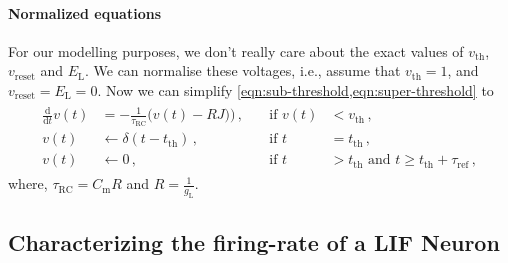 \documentclass[10pt,letterpaper,oneside]{article}
\begin{document}

\paragraph{Normalized equations}
For our modelling purposes, we don't really care about the exact values of $v_\mathrm{th}$, $v_\mathrm{reset}$ and $E_\mathrm{L}$. We can normalise these voltages, i.e., assume that $v_\mathrm{th} = 1$, and $v_\mathrm{reset} = E_\mathrm{L} = 0$. Now we can simplify \cref{eqn:sub-threshold,eqn:super-threshold} to
\begin{align}
	\begin{aligned}
		\frac{\mathrm{d}}{\mathrm{d}t} v(t) &= -\frac{1}{\tau_\mathrm{RC}} \big( v(t) - RJ \big)
		\big) \,, \quad &\text{if } v(t) &< v_\mathrm{th}\,, \\
		v(t) &\gets \delta(t - t_\mathrm{th}) \,, &\text{if } t &= t_\mathrm{th} \,,\\
v(t) &\gets 0 \,, &\text{if } t &> t_\mathrm{th} \text{ and } t \geq t_\mathrm{th} + \tau_\mathrm{ref} \,,
	\end{aligned}
	\label{eqn:sub-threshold-normalised}
\end{align}
where, $\tau_\mathrm{RC} = C_\mathrm{m} R$ and $R = \frac{1}{g_\mathrm{L}}$.

\subsection{Characterizing the firing-rate of a LIF Neuron}
\end{document}

